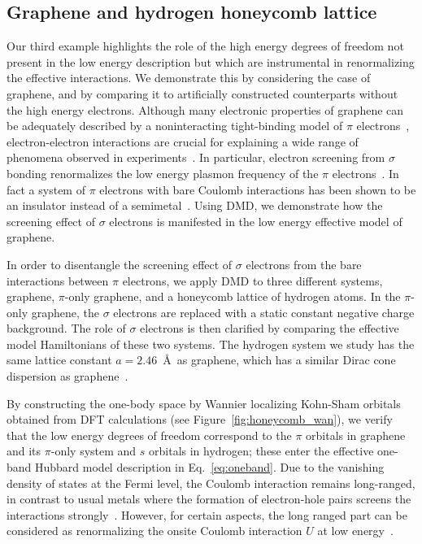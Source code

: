 \subsection{Graphene and hydrogen honeycomb lattice}
\label{subsection:graphene}
Our third example highlights the role of the high energy 
degrees of freedom not present in the low energy description 
but which are instrumental in renormalizing the effective interactions. 
We demonstrate this by considering the case of graphene, and by 
comparing it to artificially constructed counterparts without the high energy electrons. 
Although many electronic properties of graphene can be adequately 
described by a noninteracting tight-binding model of $\pi$ electrons~\cite{Castro2009}, 
electron-electron interactions are crucial for explaining 
a wide range of phenomena observed in experiments~\cite{Kotov2012}. 
In particular, electron screening from $\sigma$ bonding renormalizes 
the low energy plasmon frequency of the $\pi$ electrons~\cite{Zheng2016}. 
In fact a system of $\pi$ electrons with bare Coulomb interactions has been shown to be an insulator instead of a semimetal~\cite{DrutPRL2009, DrutPRB2009,  Smith2014, Zheng2016}. 
Using DMD, we demonstrate how the screening effect of $\sigma$ electrons is manifested in the low energy effective model of graphene. 

In order to disentangle the screening effect of $\sigma$ electrons from the bare interactions 
between $\pi$ electrons, we apply DMD to three different systems, graphene, $\pi$-only graphene, and a honeycomb lattice of hydrogen atoms.  
In the $\pi$-only graphene, the 
$\sigma$ electrons are replaced with a static constant negative charge background. 
The role of $\sigma$ electrons is then clarified by comparing the effective model Hamiltonians of these two systems. 
The hydrogen system we study has the same lattice constant $a=2.46$~\AA~as graphene, 
which has a similar Dirac cone dispersion as graphene~\cite{Zheng2016}. 

By constructing the one-body space by Wannier localizing Kohn-Sham orbitals obtained from DFT calculations (see Figure~\ref{fig:honeycomb_wan}), 
we verify that the low energy degrees of freedom correspond to the $\pi$ orbitals in graphene and 
its $\pi$-only system and $s$ orbitals in hydrogen; these enter the effective one-band Hubbard model description in Eq.~\eqref{eq:oneband}. 
Due to the vanishing density of states at the Fermi level, the Coulomb interaction remains long-ranged, 
in contrast to usual metals where the formation of electron-hole pairs screens the interactions strongly~\cite{Zheng2016}. 
However, for certain aspects, the long ranged part can be considered as renormalizing the 
onsite Coulomb interaction $U$ at low energy~\cite{Schuler2013, Changlani2015}. 

